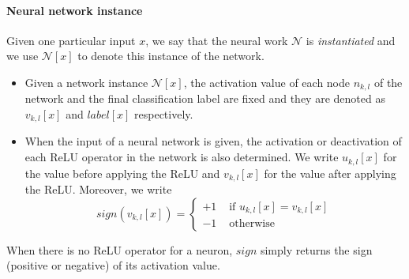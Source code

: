 \documentclass[runningheads,a4paper]{llncs}
\newcommand{\networks}{\mathcal{N}}
\begin{document}
\paragraph{Neural network instance}

Given one particular input $x$, we say that the neural work $\networks$ is
\emph{instantiated} and we use $\networks[x]$ to denote this instance of the
network.

\begin{itemize}
  \item Given a network instance $\networks[x]$, the activation value of
    each node $n_{k,l}$ of the network and the final classification label
    are fixed and they are denoted as $v_{k,l}[x]$ and $\mathit{label}[x]$
    respectively.

    \item When the input of a neural network is given, the activation or
deactivation of each ReLU operator in the network is also determined.  We
write $u_{k,l}[x]$ for the value before applying the ReLU and $v_{k,l}[x]$
for the value after applying the ReLU.  Moreover, we write
%
  \begin{equation}
    \label{eq:sign}
    \mathit{sign}(v_{k,l}[x])=
    \begin{cases}
      +1 &\mbox{  if } u_{k,l}[x] = v_{k,l}[x] \\
      -1 & \mbox{  otherwise}
    \end{cases}
  \end{equation}
\end{itemize}

When there is no ReLU operator for a neuron, $\mathit{sign}$ simply returns
the sign (positive or negative) of its activation value.
\end{document}
